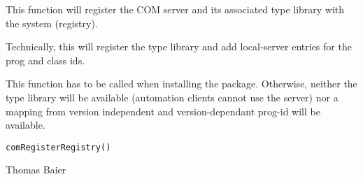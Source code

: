 \begin{Description}\relax
This function will register the COM server and its associated type library
with the system (registry).

Technically, this will register the type library and add local-server entries
for the prog and class ids.

This function has to be called when installing the package. Otherwise, neither
the type library will be available (automation clients cannot use the server)
nor a mapping from version independent and version-dependant prog-id will
be available.
\end{Description}
\begin{Usage}
\begin{verbatim}
comRegisterRegistry()
\end{verbatim}
\end{Usage}
\begin{Arguments}
\end{Arguments}
\begin{Author}\relax
Thomas Baier
\end{Author}
\begin{SeeAlso}\relax
{}
\end{SeeAlso}

